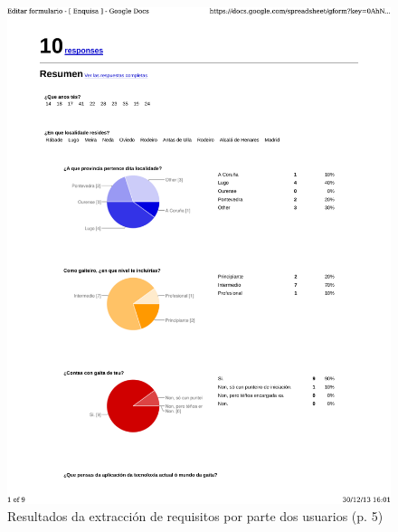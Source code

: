   \begin{figure}[htbp]
   \centering
   \includegraphics[scale=0.7,page=5,keepaspectratio=true]{./imagenes/enquisa.pdf}
   \caption{Resultados da extracción de requisitos por parte dos usuarios (p. 5)}
   \label{figura:ResultadosExtraccionRequisitosUsuarios5}
  \end{figure}

